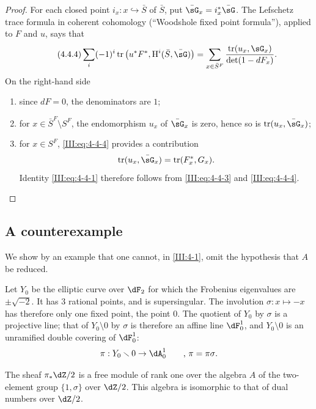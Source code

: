 \begin{proof}
For each closed point $i_x:x\hookrightarrow \bar  S$ of $\bar S$, put
$\bar\sG_x = i_x^*\bar\sG$. The Lefschetz trace formula in coherent
cohomology (``Woodshole fixed point formula''), applied to $F$ and $u$, says
that
\begin{equation*}\tag{4.4.4}\label{III:eq:4-4-4}
  \sum_i (-1)^i \tr\left(u^* F^*, \h^i(\bar S,\bar\sG)\right) = \sum_{x\in \bar S^F} \frac{\tr(u_x,\sG_x)}{\det(1-d F_x)} \text{.}
\end{equation*}
On the right-hand side
\begin{enumerate}[\indent a)]
  \item since $d F=0$, the denominators are $1$;
  \item for $x\in \bar S^F\setminus S^F$, the endomorphism $u_x$ of $\bar\sG_x$
    is zero, hence so is $\tr(u_x,\bar\sG_x)$;
  \item for $x\in S^F$, \eqref{III:eq:4-4-4} provides a contribution
    \[
      \tr(u_x,\bar\sG_x) = \tr(F_x^*,G_x) \text{.}
    \]
    Identity \eqref{III:eq:4-4-1} therefore follows from \eqref{III:eq:4-4-3}
    and \eqref{III:eq:4-4-4}.
\end{enumerate}
\end{proof}




\subsection{A counterexample}\label{III:4-5}

We show by an example that one cannot, in \ref{III:4-1}, omit
the hypothesis that $A$ be reduced.

Let $Y_0$ be the elliptic curve over $\dF_2$ for which the Frobenius
eigenvalues are $\pm \sqrt{-2}$. It has $3$ rational points, and is
supersingular. The involution $\sigma:x\mapsto -x$ has therefore only one fixed
point, the point $0$. The quotient of $Y_0$ by $\sigma$ is a projective line;
that of $Y_0\setminus 0$ by $\sigma$ is therefore an affine line $\dF_0^1$, and
$Y_0\setminus 0$ is an unramified double covering of $\dF_0^1$:
\[
  \pi:Y_0\setminus 0 \to \dA_0^1 \qquad \text{, $\pi=\pi\sigma$.}
\]

The sheaf $\pi_*\dZ/2$ is a free module of rank one over the algebra $A$ of
the two-element group $\{1,\sigma\}$ over $\dZ/2$. This algebra is
isomorphic to that of dual numbers over $\dZ/2$.

